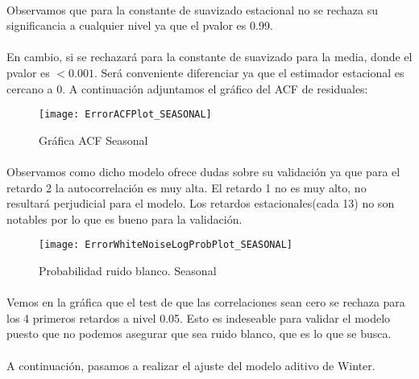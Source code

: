 \documentclass[a4paper, spanish]{article}
\begin{document}
      \paragraph{}
      Observamos que para la constante de suavizado estacional no se rechaza su significancia a cualquier nivel ya que el pvalor es 0.99.

      \paragraph{}
      En cambio, si se rechazará para la constante de suavizado para la media, donde el pvalor es $<0.001$. Será conveniente diferenciar ya que el estimador estacional es cercano a 0. A continuación adjuntamos el gráfico del ACF de residuales:

      \begin{figure}[h]
        \centering
        \texttt{[image: ErrorACFPlot\_SEASONAL]}
        \caption{Gráfica ACF Seasonal}
        \label{}
      \end{figure}

      \paragraph{}
      Observamos como dicho modelo ofrece dudas sobre su validación ya que para el retardo 2 la autocorrelación es muy alta. El retardo 1 no es muy alto, no resultará perjudicial para el modelo. Los retardos estacionales(cada 13) no son notables por lo que es bueno para la validación.

      \begin{figure}[h]
        \centering
        \texttt{[image: ErrorWhiteNoiseLogProbPlot\_SEASONAL]}
        \caption{Probabilidad ruido blanco. Seasonal}
        \label{}
      \end{figure}

      \paragraph{}
      Vemos en la gráfica que el test de que las correlaciones sean cero se rechaza para los 4 primeros retardos a nivel 0.05. Esto es indeseable para validar el modelo puesto que no podemos asegurar que sea ruido blanco, que es lo que se busca.

      \paragraph{}
      A continuación, pasamos a realizar el ajuste del modelo aditivo de Winter.
\end{document}
